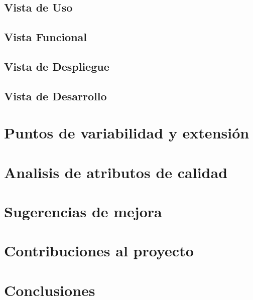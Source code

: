 \documentclass{article}
\begin{document}
  
\subsection{Vista de Uso}
\subsection{Vista Funcional}
\subsection{Vista de Despliegue}
\subsection{Vista de Desarrollo}



\section{Puntos de variabilidad y extensión}
\section{Analisis de atributos de calidad}
\section{Sugerencias de mejora}
\section{Contribuciones al proyecto}
\section{Conclusiones}

\printbibliography
\end{document}
